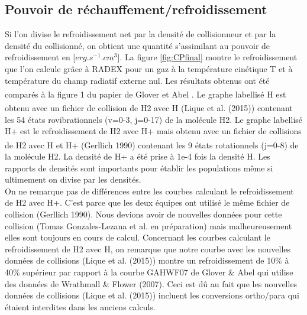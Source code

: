 \documentclass[10pt, a4paper]{report}
\numberwithin{equation}{subsection}
\begin{document}

\subsection{Pouvoir de réchauffement/refroidissement}
Si l'on divise le refroidissement net par la densité de collisionneur et par la densité du collisionné, on obtient une quantité s'assimilant au pouvoir de refroidissement en [$erg.s^{-1}.cm^{3}$]. La figure \ref{fig:CPfinal} montre le refroidissement que l'on calcule grâce à RADEX pour un gaz à la température cinétique T et à température du champ radiatif externe nul. Les résultats obtenus ont été comparés à la figure 1 du papier de Glover et Abel \textsuperscript{\cite{Glover}}. Le graphe labellisé H est obtenu avec un fichier de collision de H2 avec H (Lique et al. (2015))\textsuperscript{\cite{Lique}} contenant les 54 états rovibrationnels (v=0-3, j=0-17) de la molécule H2. Le graphe labellisé H+ est le refroidissement de H2 avec H+ mais obtenu avec un fichier de collisions de H2 avec H et H+ (Gerllich 1990)\textsuperscript{\cite{Gerlich}} contenant les 9 états rotationnels (j=0-8) de la molécule H2. La densité de H+ a été prise à 1e-4 fois la densité H. Les rapports de densités sont importants pour établir les populations même si ultimement on divise par les densités.\\
On ne remarque pas de différences entre les courbes calculant le refroidissement de H2 avec H+. C'est parce que les deux équipes ont utilisé le même fichier de collision (Gerllich 1990). Nous devions avoir de nouvelles données pour cette collision (Tomas Gonzales-Lezana et al. en préparation) mais malheureusement elles sont toujours en cours de calcul.
Concernant les courbes calculant le refroidissement de H2 avec H, on remarque que notre courbe avec les nouvelles données de collisions (Lique et al. (2015)) montre un refroidissement de 10\% à 40\% supérieur par rapport à la courbe GAHWF07 de Glover \& Abel qui utilise des données de Wrathmall \& Flower (2007). Ceci est dû au fait que les nouvelles données de collisions (Lique et al. (2015)) incluent les conversions ortho/para qui étaient interdites dans les anciens calculs.
\end{document}
